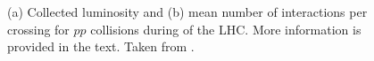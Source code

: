 \begin{figure}[t]
    \centering
    \hspace{-3.8em}
    \caption{(a) Collected luminosity and (b) mean number of interactions per crossing for $pp$ collisions during \RunTwo of the LHC. More information is provided in the text. Taken from .}
    \label{fig:run-2-data-taking}
\end{figure}


